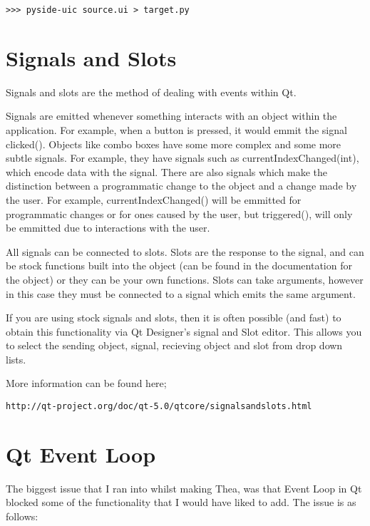 \documentclass[whitecover]{MO_report}
\begin{document}
\begin{verbatim}
>>> pyside-uic source.ui > target.py
\end{verbatim}

\section{Signals and Slots}

Signals and slots are the method of dealing with events within Qt.

Signals are emitted whenever something interacts with an object within the
application. For example, when a button is pressed, it would emmit the signal
clicked(). Objects like combo boxes have some more complex and some more subtle
signals. For example, they have signals such as currentIndexChanged(int),
which encode data with the signal. There are also signals which make the
distinction between a programmatic change to the object and a change made by
the user. For example, currentIndexChanged() will be emmitted for programmatic
changes or for ones caused by the user, but triggered(), will only be emmitted
due to interactions with the user.

\vspace{4mm}

All signals can be connected to slots. Slots are the response to the signal,
and can be stock functions built into the object (can be found in the
documentation for the object) or they can be your own functions.
Slots can take arguments, however in this case they must be connected to a
signal which emits the same argument.

If you are using stock signals and slots, then it is often possible (and fast)
to obtain this functionality via Qt Designer's signal and Slot editor.
This allows you to select the sending object, signal, recieving object and slot
from drop down lists.

More information can be found here;

\begin{verbatim}
http://qt-project.org/doc/qt-5.0/qtcore/signalsandslots.html
\end{verbatim}

\section{Qt Event Loop}

The biggest issue that I ran into whilst making Thea, was that Event Loop in
Qt blocked some of the functionality that I would have liked to add.
The issue is as follows:
\end{document}
